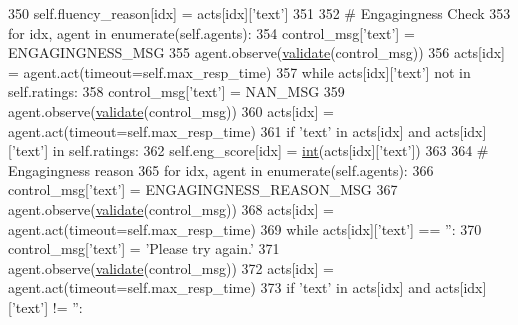 \begin{DoxyCode}
350                             self.fluency\_reason[idx] = acts[idx][\textcolor{stringliteral}{'text'}]
351 
352                     \textcolor{comment}{# Engagingness Check}
353                     \textcolor{keywordflow}{for} idx, agent \textcolor{keywordflow}{in} enumerate(self.agents):
354                         control\_msg[\textcolor{stringliteral}{'text'}] = ENGAGINGNESS\_MSG
355                         agent.observe(\hyperlink{namespaceparlai_1_1core_1_1worlds_afc3fad603b7bce41dbdc9cdc04a9c794}{validate}(control\_msg))
356                         acts[idx] = agent.act(timeout=self.max\_resp\_time)
357                         \textcolor{keywordflow}{while} acts[idx][\textcolor{stringliteral}{'text'}] \textcolor{keywordflow}{not} \textcolor{keywordflow}{in} self.ratings:
358                             control\_msg[\textcolor{stringliteral}{'text'}] = NAN\_MSG
359                             agent.observe(\hyperlink{namespaceparlai_1_1core_1_1worlds_afc3fad603b7bce41dbdc9cdc04a9c794}{validate}(control\_msg))
360                             acts[idx] = agent.act(timeout=self.max\_resp\_time)
361                         \textcolor{keywordflow}{if} \textcolor{stringliteral}{'text'} \textcolor{keywordflow}{in} acts[idx] \textcolor{keywordflow}{and} acts[idx][\textcolor{stringliteral}{'text'}] \textcolor{keywordflow}{in} self.ratings:
362                             self.eng\_score[idx] = \hyperlink{namespacelanguage__model_1_1eval__ppl_a7d12ee00479673c5c8d1f6d01faa272a}{int}(acts[idx][\textcolor{stringliteral}{'text'}])
363 
364                     \textcolor{comment}{# Engagingness reason}
365                     \textcolor{keywordflow}{for} idx, agent \textcolor{keywordflow}{in} enumerate(self.agents):
366                         control\_msg[\textcolor{stringliteral}{'text'}] = ENGAGINGNESS\_REASON\_MSG
367                         agent.observe(\hyperlink{namespaceparlai_1_1core_1_1worlds_afc3fad603b7bce41dbdc9cdc04a9c794}{validate}(control\_msg))
368                         acts[idx] = agent.act(timeout=self.max\_resp\_time)
369                         \textcolor{keywordflow}{while} acts[idx][\textcolor{stringliteral}{'text'}] == \textcolor{stringliteral}{''}:
370                             control\_msg[\textcolor{stringliteral}{'text'}] = \textcolor{stringliteral}{'Please try again.'}
371                             agent.observe(\hyperlink{namespaceparlai_1_1core_1_1worlds_afc3fad603b7bce41dbdc9cdc04a9c794}{validate}(control\_msg))
372                             acts[idx] = agent.act(timeout=self.max\_resp\_time)
373                         \textcolor{keywordflow}{if} \textcolor{stringliteral}{'text'} \textcolor{keywordflow}{in} acts[idx] \textcolor{keywordflow}{and} acts[idx][\textcolor{stringliteral}{'text'}] != \textcolor{stringliteral}{''}:

\end{DoxyCode}
